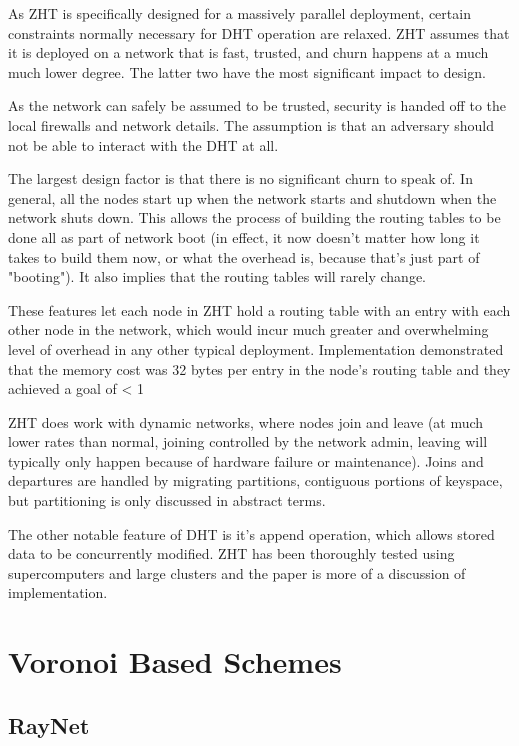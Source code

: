 \documentclass[10pt,letterpaper]{report}
\begin{document}
As ZHT is specifically designed for a massively parallel deployment, certain constraints normally necessary for DHT operation are relaxed.  ZHT assumes that it is deployed on a network that is fast, trusted, and churn happens at a much much lower degree.  The latter two have the most significant impact to design.

 As the network can safely be assumed to be trusted, security is handed off to the local firewalls and network details.   The assumption is that an adversary should not be able to interact with the DHT at all.  

The largest design factor is that there is no significant churn to speak of.  In general, all the nodes start up when the network starts and shutdown when the network shuts down.  This  allows the process of building the routing tables to be done all as part of network boot (in effect, it now doesn't matter how long it takes to build them now, or what the overhead is, because that's just part of "booting").  It also implies that the routing tables will rarely change.  

These features let each node in ZHT hold a routing table with an entry with each other node in the network, which would incur much greater and overwhelming level of overhead in any  other typical deployment.  Implementation demonstrated that the memory cost was 32 bytes per entry in the node's routing table and they achieved a goal of < 1%

ZHT does work with dynamic networks, where nodes join and leave (at much lower rates than normal,  joining controlled by the network admin, leaving will typically only happen because of hardware failure or maintenance).  Joins and departures  are handled by migrating partitions, contiguous portions of keyspace, but partitioning is only discussed in abstract terms.

The other notable feature of DHT is it's append operation, which allows stored data  to be concurrently modified.  ZHT has been thoroughly tested using  supercomputers and large clusters and the paper is more of a discussion of implementation. 



\section{Voronoi Based Schemes}



\subsection{RayNet}
\end{document}
